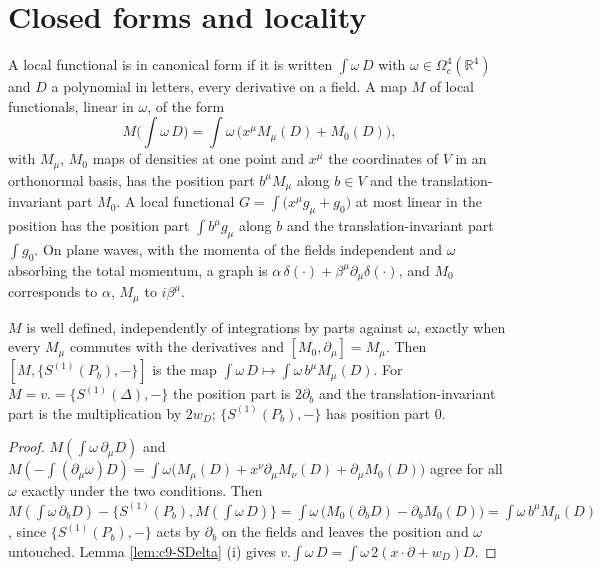 \section{Closed forms and locality}

\begin{definition}
\label{def:c11-canonical}
A local functional is in canonical form if it is written $\int\omega\,D$ with $\omega\in\Omega^4_c(\mathbb R^4)$ and $D$ a polynomial in letters, every derivative on a field. A map $M$ of local functionals, linear in $\omega$, of the form
\[
M\Big(\int\omega\,D\Big)=\int\omega\,\big(x^\mu M_\mu(D)+M_0(D)\big),
\]
with $M_\mu$, $M_0$ maps of densities at one point and $x^\mu$ the coordinates of $V$ in an orthonormal basis, has the position part $b^\mu M_\mu$ along $b\in V$ and the translation-invariant part $M_0$. A local functional $G=\int\big(x^\mu g_\mu+g_0\big)$ at most linear in the position has the position part $\int b^\mu g_\mu$ along $b$ and the translation-invariant part $\int g_0$. On plane waves, with the momenta of the fields independent and $\omega$ absorbing the total momentum, a graph is $\alpha\,\delta(\cdot)+\beta^\mu\partial_\mu\delta(\cdot)$, and $M_0$ corresponds to $\alpha$, $M_\mu$ to $i\beta^\mu$.
\end{definition}

\begin{lemma}
\label{lem:c11-canonical}
$M$ is well defined, independently of integrations by parts against $\omega$, exactly when every $M_\mu$ commutes with the derivatives and $[M_0,\partial_\mu]=M_\mu$. Then $[M,\{S^{(1)}(P_b),-\}]$ is the map $\int\omega\,D\mapsto\int\omega\,b^\mu M_\mu(D)$. For $M=v.=\{S^{(1)}(\Delta),-\}$ the position part is $2\partial_b$ and the translation-invariant part is the multiplication by $2w_D$; $\{S^{(1)}(P_b),-\}$ has position part $0$.
\end{lemma}

\begin{proof}
$M(\int\omega\,\partial_\mu D)$ and $M(-\int(\partial_\mu\omega)D)=\int\omega\big(M_\mu(D)+x^\nu\partial_\mu M_\nu(D)+\partial_\mu M_0(D)\big)$ agree for all $\omega$ exactly under the two conditions. Then $M(\int\omega\,\partial_bD)-\{S^{(1)}(P_b),M(\int\omega\,D)\}=\int\omega\,\big(M_0(\partial_bD)-\partial_bM_0(D)\big)=\int\omega\,b^\mu M_\mu(D)$, since $\{S^{(1)}(P_b),-\}$ acts by $\partial_b$ on the fields and leaves the position and $\omega$ untouched. Lemma \ref{lem:c9-SDelta} (i) gives $v.\int\omega\,D=\int\omega\,2(x\cdot\partial+w_D)D$.
\end{proof}

